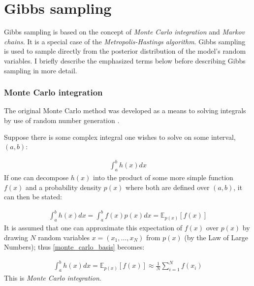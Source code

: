 \documentclass[14pt]{extarticle} %
\begin{document}
	\newpage



%	
	
%	
	
%	
	
	

\newpage

\appendix

\section{Gibbs sampling} \label{sec:additional_theory:sub_sec:gibbs_sampler}
Gibbs sampling is based on the concept of \emph{Monte Carlo integration} and \emph{Markov chains}. It is a special case of the \emph{Metropolis-Hastings algorithm}. Gibbs sampling is used to sample directly from the posterior distribution of the model's random variables. I briefly describe the emphasized terms below before describing Gibbs sampling in more detail.

\subsubsection{Monte Carlo integration}
The original Monte Carlo method was developed as a means to solving integrals by use of random number generation \citep{MetropolisMonteCarloMethod1949}.

Suppose there is some complex integral one wishes to solve on some interval, $(a,b)$:

\begin{align}
\int_a^b h(x) dx
\end{align}
If one can decompose $h(x)$ into the product of some more simple function $f(x)$ and a probability density $p(x)$ where both are defined over $(a,b)$, it can then be stated:

\begin{align} \label{monte_carlo_basis}
\int_a^bh(x)dx = \int_a^bf(x)p(x)dx = \mathbb{E}_{p(x)}\left[f(x)\right]
\end{align}
It is assumed that one can approximate this expectation of $f(x)$ over $p(x)$ by drawing $N$ random variables $x = (x_1,\ldots,x_N)$ from $p(x)$ (by the Law of Large Numbers); thus \eqref{monte_carlo_basis} becomes:

\begin{align} \label{monte_carlo_integration}
\int_a^bh(x)dx = \mathbb{E}_{p(x)}\left[f(x)\right] \approx \frac{1}{N}\sum_{i=1}^Nf(x_i)
\end{align}
This is \emph{Monte Carlo integration}.
\end{document}
